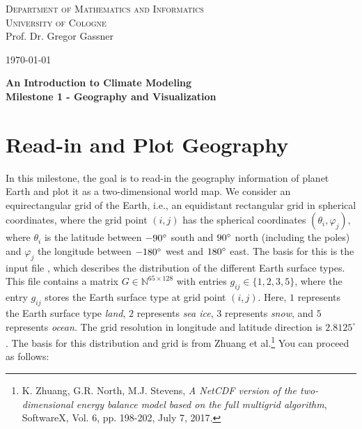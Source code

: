 \documentclass[10pt]{scrartcl}
\begin{document}
\begin{minipage}{.5\textwidth}
{\scshape Department of Mathematics and Informatics \\
University of Cologne\\}
\small Prof. Dr. Gregor Gassner \\
\end{minipage}
\hfill
\begin{minipage}{.3\textwidth}
\begin{flushright}
\today
\end{flushright}
\end{minipage}

\begin{center}
{\Large\bfseries
An Introduction to Climate Modeling}\\
\vspace{0.2cm}
{\bfseries Milestone 1 - Geography and Visualization}
\end{center}

\section{Read-in and Plot Geography}

In this milestone, the goal is to read-in the geography information of planet Earth and plot it as a two-dimensional world map.
We consider an equirectangular grid of the Earth, i.e., an equidistant rectangular grid in spherical coordinates, where the grid point $(i, j)$ has the spherical coordinates $(\theta_i, \varphi_j)$, where $\theta_i$ is the latitude between $-90\degree$ south and $90\degree$ north (including the poles) and $\varphi_j$ the longitude between $-180\degree$ west and $180\degree$ east.
The basis for this is the input file
\small\texttt{}\normalsize, which describes the distribution of the different Earth surface types.
This file contains a matrix $G \in \mathbb{N}^{65 \times 128}$ with entries $g_{ij} \in \{1,2,3,5\}$, where the entry $g_{ij}$ stores the Earth surface type at grid point $(i, j)$.
Here, $1$ represents the Earth surface type \textit{land}, $2$ represents \textit{sea ice}, $3$ represents \textit{snow}, and $5$ represents \textit{ocean}. The grid resolution in longitude and latitude direction is $2.8125^{\circ}$.
The basis for this distribution and grid is from Zhuang et al.\footnote{K. Zhuang, G.R. North, M.J. Stevens, {\em A NetCDF version of the two-dimensional energy balance model based on the full multigrid algorithm}, SoftwareX, Vol. 6, pp. 198-202, July 7, 2017.}
You can proceed as follows:
\end{document}
